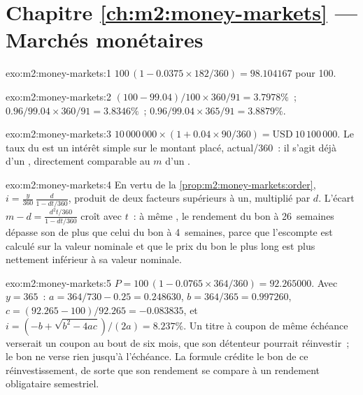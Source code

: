 \section*{Chapitre \ref{ch:m2:money-markets} --- Marchés monétaires}

\begin{solution}{exo:m2:money-markets:1}
$100\,(1 - 0.0375 \times 182/360) = 98.104167$ pour 100.
\end{solution}

\begin{solution}{exo:m2:money-markets:2}
 $(100 - 99.04)/100 \times 360/91 = 3.7978\%$~; 
$0.96/99.04 \times 360/91 = 3.8346\%$~;  $0.96/99.04
\times 365/91 = 3.8879\%$.
\end{solution}

\begin{solution}{exo:m2:money-markets:3}
$10\,000\,000 \times (1 + 0.04 \times 90/360) = \text{USD}~10\,100\,000$. Le taux du  est un intérêt simple sur le montant placé, actual/360~: il s'agit déjà d'un
, directement comparable au $m$ d'un .
\end{solution}

\begin{solution}{exo:m2:money-markets:4}
En vertu de la \cref{prop:m2:money-markets:order}, $i = \frac{y}{360}\,\frac{d}{1 -
dt/360}$, produit de deux facteurs supérieurs à un, multiplié par $d$. L'écart $m - d =
\frac{d^2 t/360}{1 - dt/360}$ croît avec $t$~: à même , le
rendement du bon à 26~semaines dépasse son  de plus que celui du bon à 4~semaines,
parce que l'escompte est calculé sur la valeur nominale et que le prix du bon le plus long est
plus nettement inférieur à sa valeur nominale.
\end{solution}

\begin{solution}{exo:m2:money-markets:5}
$P = 100\,(1 - 0.0765 \times 364/360) = 92.265000$. Avec $y = 365$~: $a =
364/730 - 0.25 = 0.248630$, $b = 364/365 = 0.997260$, $c = (92.265 -
100)/92.265 = -0.083835$, et $i = (-b + \sqrt{b^2 - 4ac})/(2a) = 8.237\%$. Un
titre à coupon de même échéance verserait un coupon au bout de six mois,
que son détenteur pourrait réinvestir~; le bon ne verse rien jusqu'à l'échéance. La
formule crédite le bon de ce réinvestissement, de sorte que son rendement se compare
à un rendement obligataire semestriel.
\end{solution}

